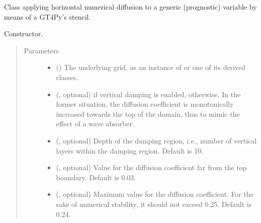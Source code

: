 \documentclass[letterpaper,10pt,english]{sphinxmanual}
\begin{document}
\begin{fulllineitems}
\label{\detokenize{api:dycore.diffusion.Diffusion}}
Class applying horizontal numerical diffusion to a generic (prognostic) variable by means of a GT4Py’s stencil.

\begin{fulllineitems}
\label{\detokenize{api:dycore.diffusion.Diffusion.__init__}}
Constructor.
\begin{quote}\begin{description}
\item[{Parameters}] \leavevmode\begin{itemize}
\item {} 
 () \textendash{} The underlying grid, as an instance of {\hyperref[\detokenize{api:grids.xyz_grid.XYZGrid}]{}} or one of its
derived classes.

\item {} 
 (, optional) \textendash{}  if vertical damping is enabled,  otherwise.
In the former situation, the diffusion coefficient is monotonically increased towards the
top of the domain, thus to mimic the effect of a wave absorber.

\item {} 
 (, optional) \textendash{} Depth of the damping region, i.e., number of vertical layers
within the damping region. Default is 10.

\item {} 
 (, optional) \textendash{} Value for the diffusion coefficient far from the top boundary.
Default is 0.03.

\item {} 
 (, optional) \textendash{} Maximum value for the diffusion coefficient. For the sake of numerical
stability, it should not exceed 0.25. Default is 0.24.


\end{itemize}
\end{description}
\end{quote}
\end{fulllineitems}
\end{fulllineitems}
\end{document}
